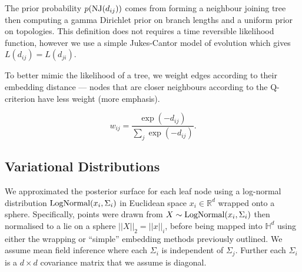\documentclass[11pt, twocolumn]{article}
\newcommand{\be}{\begin{equation*}}
\newcommand{\ee}{\end{equation*}}
\begin{document}
The prior probability $p(\textnormal{NJ}(d_{ij}))$ comes from forming a neighbour joining tree then computing a gamma Dirichlet prior on branch lengths and a uniform prior on topologies.
This definition does not requires a time reversible likelihood function, however we use a simple Jukes-Cantor model of evolution which gives $L(d_{ij})=L(d_{ji})$.

To better mimic the likelihood of a tree, we weight edges according to their embedding distance --- nodes that are closer neighbours according to the Q-criterion have less weight (more emphasis).

\be
w_{ij} = \frac{\exp(-d_{ij})}{\sum_{j} \exp(-d_{ij})}.
\ee




\subsection{Variational Distributions}
We approximated the posterior surface for each leaf node using a log-normal distribution $\textnormal{LogNormal}(x_{i}, \Sigma_{i})$ in Euclidean space $x_{i} \in \mathbb{R}^{d}$ wrapped onto a sphere.
Specifically, points were drawn from $X \sim \textnormal{LogNormal}(x_{i}, \Sigma_{i})$ then normalised to a lie on a sphere $||X||_{2} = ||x||_{i}$, before being mapped into $\mathbb{H}^{d}$ using either the wrapping or ``simple'' embedding methods previously outlined.
We assume mean field inference where each $\Sigma_{i}$ is independent of $\Sigma_{j}$.
Further each $\Sigma_{i}$ is a $d \times d$ covariance matrix that we assume is diagonal.
\end{document}
